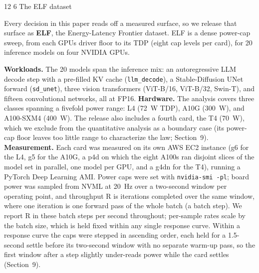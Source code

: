 \documentclass[3p,twocolumn]{elsarticle}
\makeatletter
\renewcommand\section{\@startsection{section}{1}{\z@}%
           {12\p@ \@plus 4\p@ \@minus 4\p@}%
           {6\p@ \@plus 4\p@ \@minus 3\p@}%
           {\normalsize\bfseries\boldmath}}
\makeatother
\begin{document}
\section{The ELF dataset}\label{the-elf-dataset}

Every decision in this paper reads off a measured surface, so we release that surface as \textbf{ELF}, the
Energy-Latency Frontier dataset. ELF is a dense power-cap sweep, from each GPU\textquotesingle s
driver floor to its TDP (eight cap levels per card), for 20 inference models on four NVIDIA GPUs.

\textbf{Workloads.} The 20 models span the inference mix: an autoregressive LLM decode step with a pre-filled
KV cache (\texttt{llm\_decode}), a Stable-Diffusion UNet forward (\texttt{sd\_unet}), three vision
transformers (ViT-B/16, ViT-B/32, Swin-T), and fifteen convolutional networks, all at FP16. \textbf{Hardware.}
The analysis covers three classes spanning a fivefold power range: L4 (72~W TDP), A10G (300~W), and
A100-SXM4 (400~W). The release also includes a fourth card, the T4 (70~W), which we exclude from the
quantitative analysis as a boundary case (its power-cap floor leaves too little range to characterize the law;
Section~9). \textbf{Measurement.} Each card was measured on its own AWS EC2 instance (g6 for the L4, g5 for
the A10G, a p4d on which the eight A100s ran disjoint slices of the model set in parallel, one model per GPU, and a g4dn for the T4), running a PyTorch Deep Learning AMI. Power caps
were set with \texttt{nvidia-smi\ -pl}; board power was sampled from
NVML at 20~Hz over a two-second window per operating point, and throughput R is iterations completed over
the same window, where one iteration is one forward pass of the whole batch (a batch step). We report R in
these batch steps per second throughout; per-sample rates scale by the batch size, which is held fixed within
any single response curve. Within a response curve the caps were stepped in ascending order, each held for a 1.5-second settle before its two-second window with no separate warm-up pass, so the first window after a step slightly under-reads power while the card settles (Section~9).
\end{document}
